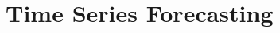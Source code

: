 \documentclass[../main.tex]{subfiles}
\begin{document}
    \section{Time Series Forecasting}
        
        
        
\end{document}

